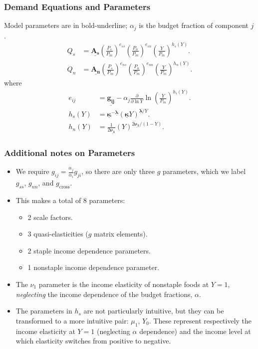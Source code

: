 \documentclass{beamer}
\begin{document}
\newcommand{\bmu}[1]{\underline{\boldsymbol{#1}}}

\begin{frame}
  \frametitle{Demand Equations and Parameters}
  Model parameters are in bold-underline; $\alpha_j$ is the budget
  fraction of component $j$.
    \begin{align}
    Q_s &=
    \bmu{A_s}\left(\frac{P_s}{P_m}\right)^{e_{ss}}\left(\frac{P_n}{P_m}\right)^{e_{sn}}\left(\frac{Y}{P_m}\right)^{h_s(Y)}.\\
    Q_n &=
    \bmu{A_n}\left(\frac{P_s}{P_m}\right)^{e_{ns}}\left(\frac{P_n}{P_m}\right)^{e_{nn}}\left(\frac{Y}{P_m}\right)^{h_n(Y)}.
    \end{align}
    where
    \begin{align}
      e_{ij} &= \bmu{g_{ij}} - \alpha_j
      \frac{\partial}{\partial \ln Y} \ln\left(\frac{Y}{P_m}\right)^{h_i(Y)}.\\
      h_s(Y) &= \bmu{\kappa}^{-\bmu{\lambda}}
      \left(\bmu{\kappa}Y\right)^{\bmu{\lambda}/Y}.\\
      h_n(Y) &= \frac{1}{2\bmu{\nu_1}}\left(Y\right)^{2\bmu{\nu_1}/\left(1-Y\right)}.
    \end{align}
\end{frame}

\begin{frame}
  \frametitle{Additional notes on Parameters}
  \begin{itemize}
    \item We require $g_{ij} = \frac{\alpha_j}{\alpha_i}g_{ji}$, so there are only three $g$
      parameters, which we label $g_{ss}$, $g_{nn}$, and
      $g_{\text{cross}}$.
    \item This makes a total of 8 parameters:
      \begin{itemize}
      \item 2 scale factors.
      \item 3 quasi-elasticities ($g$ matrix elements).
      \item 2 staple income dependence parameters.
      \item 1 nonstaple income dependence parameter.
      \end{itemize}
    \item The $\nu_1$ parameter is the income elasticity of nonstaple
      foods at $Y=1$, \emph{neglecting} the income dependence of the
      budget fractions, $\alpha$.
    \item The parameters in $h_s$ are not particularly intuitive, but
      they can be transformed to a more intuitive pair: $\mu_1$,
      $Y_0$.  These represent respectively the income elasticity at
      $Y=1$ (neglecting $\alpha$ dependence) and the income level at
      which elasticity switches from positive to negative.
  \end{itemize}
\end{frame}
\end{document}
